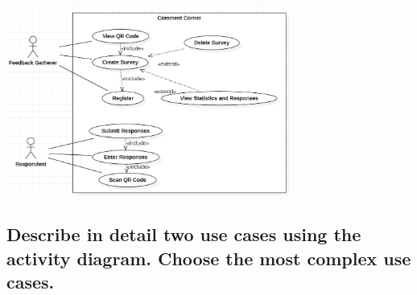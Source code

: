 \documentclass[letterpaper, 12 pt, conference]{ieeeconf}
\begin{document}
\includegraphics[width=0.70\textwidth]{caseDiagram.png}

\newpage
\subsection{Describe in detail two use cases using the activity diagram. Choose the most complex use cases.}
\end{document}

